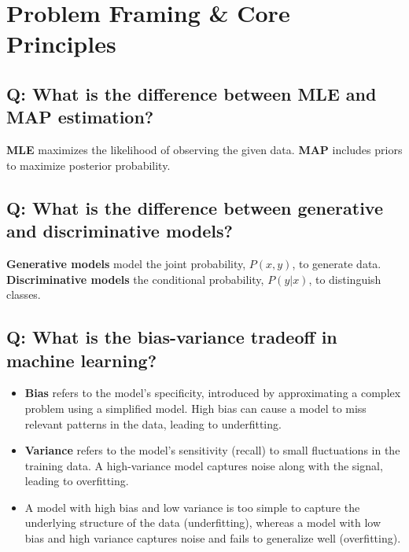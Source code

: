 \section{Problem Framing \& Core Principles}

\subsection*{Q: What is the difference between MLE and MAP estimation?}
\textbf{MLE} maximizes the likelihood of observing the given data. \textbf{MAP} includes priors to maximize posterior probability.

\subsection*{Q: What is the difference between generative and discriminative models?}
\textbf{Generative models} model the joint probability, \(P(x, y)\), to generate data. \textbf{Discriminative models} the conditional probability, \(P(y|x)\), to distinguish classes.

\subsection*{Q: What is the bias-variance tradeoff in machine learning?}
\begin{itemize}
	\item \textbf{Bias} refers to the model's specificity, introduced by approximating a complex problem using a simplified model. High bias can cause a model to miss relevant patterns in the data, leading to underfitting.
	\item \textbf{Variance} refers to the model's sensitivity (recall) to small fluctuations in the training data. A high-variance model captures noise along with the signal, leading to overfitting.
	\item A model with high bias and low variance is too simple to capture the underlying structure of the data (underfitting), whereas a model with low bias and high variance captures noise and fails to generalize well (overfitting).
\end{itemize}

